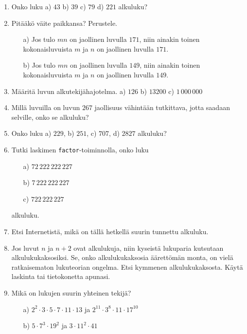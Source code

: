 \begin{enumerate}

\item Onko luku a) $43$ b) $39$ c) $79$ d) $221$ alkuluku?

\item Pitääkö väite paikkansa? Perustele.
\begin{itemize}
\item[a)] Jos tulo $mn$ on jaollinen luvulla $171$, niin ainakin
toinen kokonaisluvuista $m$ ja $n$ on jaollinen luvulla $171$.

\item[b)] Jos tulo $mn$ on jaollinen luvulla $149$, niin ainakin
toinen kokonaisluvuista $m$ ja $n$ on jaollinen luvulla $149$.
\end{itemize}

\item Määritä luvun alkutekijähajotelma. a) $126$ b) $13200$ c)
$1\, 000\, 000$

\item Millä luvuilla on luvun $267$ jaollisuus vähintään
tutkittava, jotta saadaan selville, onko se alkuluku?

\item Onko luku a) $229$, b) $251$, c) $707$, d) $2827$ alkuluku?

\item Tutki laskimen {\tt factor}-toiminnolla, onko luku
\begin{itemize}
\item[a)] $72\,222\,222\,227$
\item[b)] $7\,222\,222\,227$
\item[c)] $722\,222\,227$
\end{itemize}
alkuluku.

\item Etsi Internetistä, mikä on tällä hetkellä suurin tunnettu
alkuluku.

\item
Jos luvut $n$ ja $n + 2$ ovat alkulukuja, niin kyseistä lukuparia
kutsutaan alkulukukaksosiksi. Se, onko alkulukukaksosia
äärettömän monta, on vielä ratkaisematon lukuteorian ongelma.
Etsi kymmenen alkulukukaksosta. Käytä laskinta tai tietokonetta
apunasi.

\item Mikä on lukujen suurin yhteinen tekijä?
\begin{itemize}
\item[a)] $2^2 \cdot 3 \cdot 5 \cdot 7 \cdot 11 \cdot 13$ ja
$2^{11} \cdot 3^8 \cdot 11 \cdot 17^{10}$
\item[b)] $5 \cdot 7^3 \cdot 19^2$ ja $3 \cdot 11^2 \cdot 41$
\end{itemize}


\end{enumerate}
